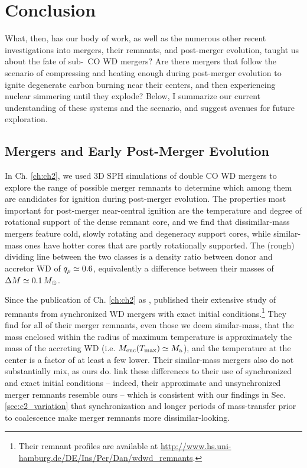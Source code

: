 \chapter{Conclusion}

What, then, has our body of work, as well as the numerous other recent investigations into mergers, their remnants, and post-merger evolution, taught us about the fate of sub-\Mch\ CO WD mergers?  Are there mergers that follow the \citeal{vkercj10} scenario of compressing and heating enough during post-merger evolution to ignite degenerate carbon burning near their centers, and then experiencing nuclear simmering until they explode?  Below, I summarize our current understanding of these systems and the \citeal{vkercj10} scenario, and suggest avenues for future exploration.

\section{Mergers and Early Post-Merger Evolution}

In Ch. \ref{ch:ch2}, we used 3D SPH simulations of double CO WD mergers to explore the range of possible merger remnants to determine which among them are candidates for ignition during post-merger evolution.  The properties most important for post-merger near-central ignition are the temperature and degree of rotational support of the dense remnant core, and we find that dissimilar-mass mergers feature cold, slowly rotating and degeneracy support cores, while similar-mass ones have hotter cores that are partly rotationally supported.  The (rough) dividing line between the two classes is a density ratio between donor and accretor WD of $\qrho\simeq0.6$, equivalently a difference between their masses of $\Delta M \simeq 0.1\,\Msun$.

Since the publication of Ch. \ref{ch:ch2} as \cite{zhu+13}, \cite{dan+14} published their extensive study of remnants from synchronized WD mergers with exact initial conditions.\footnote{Their remnant profiles are available at \url{http://www.hs.uni-hamburg.de/DE/Ins/Per/Dan/wdwd_remnants}.}  They find for all of their merger remnants, even those we deem similar-mass, that the mass enclosed within the radius of maximum temperature is approximately the mass of the accreting WD (i.e. $\MencTmax\simeq\Ma$), and the temperature at the center is a factor of at least a few lower.  Their similar-mass mergers also do not substantially mix, as ours do.  \cite{dan+14} link these differences to their use of synchronized and exact initial conditions -- indeed, their approximate and unsynchronized merger remnants resemble ours -- which is consistent with our findings in Sec. \ref{sec:c2_variation} that synchronization and longer periods of mass-transfer prior to coalescence make merger remnants more dissimilar-looking.

